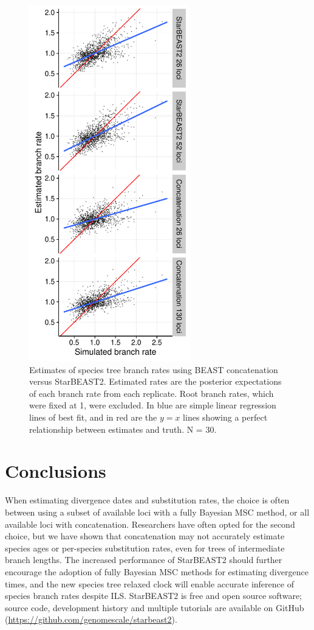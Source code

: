 \documentclass[12pt]{article}
\begin{document}
\begin{figure}[htb!]
\centering
\includegraphics[width=70mm]{branch_rates_phased.pdf}
\caption
{Estimates of species tree branch rates using BEAST concatenation versus
StarBEAST2. Estimated rates are the posterior expectations of each branch rate
from each replicate. Root branch rates, which were fixed at 1, were excluded.
In blue are simple linear regression lines of best fit, and in red are the $y
= x$ lines showing a perfect relationship between estimates and truth. N = 30.}
\label{fig:branchRates}
\end{figure}

\section{Conclusions}

When estimating divergence dates and substitution rates, the choice is often
between using a subset of available loci with a fully Bayesian MSC method, or
all available loci with concatenation. Researchers have often opted for the
second choice, but we have shown that concatenation may not accurately
estimate species ages or per-species substitution rates, even
for trees of intermediate branch lengths. The increased performance of
StarBEAST2 should further encourage the adoption of fully Bayesian MSC methods
for estimating divergence times, and the new species tree relaxed clock will
enable accurate inference of species branch rates despite ILS. StarBEAST2 is
free and open source software; source code, development history and multiple
tutorials are available on GitHub (\url{https://github.com/genomescale/starbeast2}).
\end{document}
